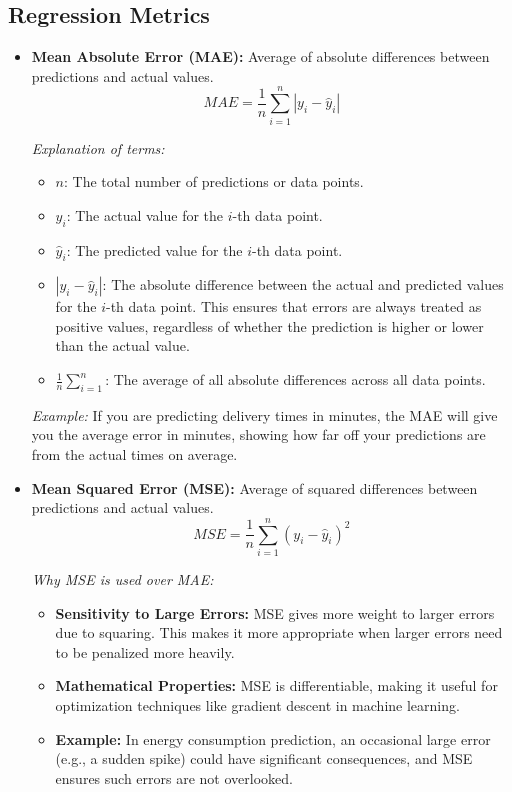 \documentclass[11pt]{article}
\begin{document}
\subsection{Regression Metrics}
\begin{itemize}
    \item \textbf{Mean Absolute Error (MAE):} Average of absolute differences between predictions and actual values. 
    \[
    MAE = \frac{1}{n} \sum_{i=1}^n |y_i - \hat{y}_i|
    \]
    
    \textit{Explanation of terms:}
    \begin{itemize}
        \item \( n \): The total number of predictions or data points.
        \item \( y_i \): The actual value for the \(i\)-th data point.
        \item \( \hat{y}_i \): The predicted value for the \(i\)-th data point.
        \item \( |y_i - \hat{y}_i| \): The absolute difference between the actual and predicted values for the \(i\)-th data point. This ensures that errors are always treated as positive values, regardless of whether the prediction is higher or lower than the actual value.
        \item \( \frac{1}{n} \sum_{i=1}^n \): The average of all absolute differences across all data points.
    \end{itemize}
    
    \textit{Example:} If you are predicting delivery times in minutes, the MAE will give you the average error in minutes, showing how far off your predictions are from the actual times on average.
    
    \item \textbf{Mean Squared Error (MSE):} Average of squared differences between predictions and actual values. 
    \[
    MSE = \frac{1}{n} \sum_{i=1}^n (y_i - \hat{y}_i)^2
    \]

    \textit{Why MSE is used over MAE:}
    \begin{itemize}
        \item \textbf{Sensitivity to Large Errors:} MSE gives more weight to larger errors due to squaring. This makes it more appropriate when larger errors need to be penalized more heavily.
        \item \textbf{Mathematical Properties:} MSE is differentiable, making it useful for optimization techniques like gradient descent in machine learning.
        \item \textbf{Example:} In energy consumption prediction, an occasional large error (e.g., a sudden spike) could have significant consequences, and MSE ensures such errors are not overlooked.
    \end{itemize}
    

\end{itemize}
\end{document}
